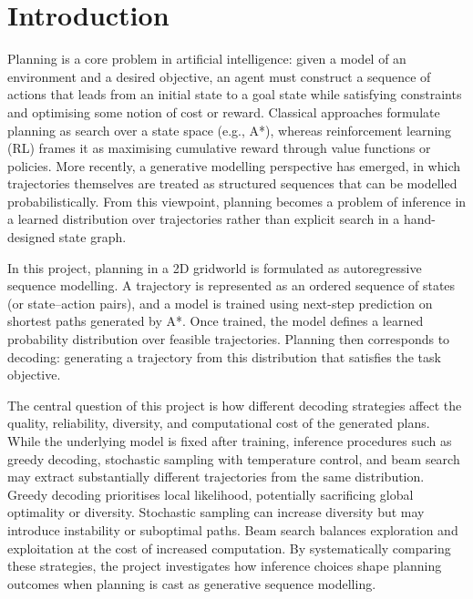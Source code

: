 \documentclass[12pt]{article}
\begin{document}
\section{Introduction}
\label{sec:introduction}

Planning is a core problem in artificial intelligence: given a model of an environment and a desired objective, an agent must construct a sequence of actions that leads from an initial state to a goal state while satisfying constraints and optimising some notion of cost or reward. Classical approaches formulate planning as search over a state space (e.g., A*), whereas reinforcement learning (RL) frames it as maximising cumulative reward through value functions or policies. More recently, a generative modelling perspective has emerged, in which trajectories themselves are treated as structured sequences that can be modelled probabilistically. From this viewpoint, planning becomes a problem of inference in a learned distribution over trajectories rather than explicit search in a hand-designed state graph.

In this project, planning in a 2D gridworld is formulated as autoregressive sequence modelling. A trajectory is represented as an ordered sequence of states (or state--action pairs), and a model is trained using next-step prediction on shortest paths generated by A*. Once trained, the model defines a learned probability distribution over feasible trajectories. Planning then corresponds to decoding: generating a trajectory from this distribution that satisfies the task objective.

The central question of this project is how different decoding strategies affect the quality, reliability, diversity, and computational cost of the generated plans. While the underlying model is fixed after training, inference procedures such as greedy decoding, stochastic sampling with temperature control, and beam search may extract substantially different trajectories from the same distribution. Greedy decoding prioritises local likelihood, potentially sacrificing global optimality or diversity. Stochastic sampling can increase diversity but may introduce instability or suboptimal paths. Beam search balances exploration and exploitation at the cost of increased computation. By systematically comparing these strategies, the project investigates how inference choices shape planning outcomes when planning is cast as generative sequence modelling.
\end{document}
